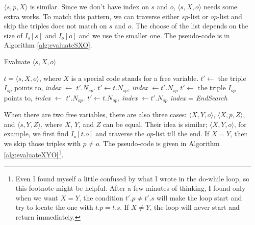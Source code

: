 \documentclass{article}
\begin{document}
\begin{enumerate}
\begin{enumerate}
$\langle s, p, X\rangle$ is similar. Since we don't have index on $s$ and $o$,  $\langle s, X, o\rangle$ needs some extra works. To match this pattern, we can traverse either $sp$-list or $op$-list and skip the triples does not match on $s$ and $o$. The choose of the list depends on the size of $I_s[s]$ and $I_o[o]$ and we use the smaller one. The pseudo-code is in Algorithm \eqref{alg:evaluateSXO}.

\begin{algorithm}[H]
\caption{Evaluate $\langle s, X, o\rangle$}\label{alg:evaluateSXO}
\begin{algorithmic}
\Require $t = \langle s, X, o\rangle$, where $X$ is a special code stands for a free variable. 
\Do
{}
\State $t'\leftarrow$ the triple $I_{sp}$ points to, \textit{index} $\leftarrow$ $t'.N_{sp}$.
\Else 
\State $t'\leftarrow t.N_{sp}$, \textit{index} $\leftarrow t'.N_{sp}$
\EndIf
{}
\Else
\Do
{}
\State $t'\leftarrow$ the triple $I_{op}$ points to, \textit{index} $\leftarrow$ $t'.N_{op}$.
\Else 
\State $t'\leftarrow t.N_{op}$, \textit{index} $\leftarrow t'.N_{op}$
\EndIf
{}
\EndIf
{}
\State \textit{index} = \textit{EndSearch}
\EndIf 
\end{algorithmic}
\end{algorithm}


When there are two free variables, there are also three cases: $\langle X, Y, o\rangle$, $\langle X, p, Z\rangle$, and $\langle s, Y, Z\rangle$, where $X$, $Y$, and $Z$ can be equal. Their idea is similar; $\langle X, Y, o\rangle$, for example, we first find $I_o[t.o]$ and traverse the $op$-list till the end. If $X=Y$, then we skip those triples with $p \neq o$. The pseudo-code is given in Algorithm \eqref{alg:evaluateXYO}\footnote{Even I found myself a little confused by what I wrote in the do-while loop, so this footnote might be helpful. After a few minutes of thinking, I found only when we want $X=Y$, the condition $t'.p \neq t'.s$ will make the loop start and try to locate the one with $t.p = t.s$. If $X\neq Y$, the loop will never start and return immediately.}.


\end{enumerate}
\end{enumerate}
\end{document}
